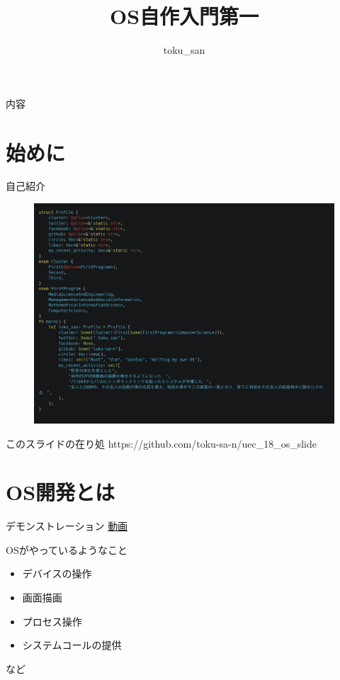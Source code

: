 \documentclass[titlepage,dvipdfmx,uplatex,a4j,12pt]{beamer}
\title{OS自作入門第一}
\author{toku\_san}
\begin{document}
\maketitle

\begin{frame}{内容}
    \tableofcontents
\end{frame}

\section{始めに}

\begin{frame}[fragile]{自己紹介}
    \begin{figure}[ht]
        \centering
        \includegraphics[width=\linewidth]{carbon.png}
        \label{fig:carbon.png}
    \end{figure}
\end{frame}

\begin{frame}{このスライドの在り処}
    https://github.com/toku-sa-n/uec\_18\_os\_slide
\end{frame}

\section{OS開発とは}

\begin{frame}{デモンストレーション}
    \href{run:demo.mp4}{動画}
\end{frame}

\begin{frame}{OSがやっているようなこと}
    \begin{itemize}
        \item デバイスの操作
        \item 画面描画
        \item プロセス操作
        \item システムコールの提供
    \end{itemize}
    など
\end{frame}
\end{document}
